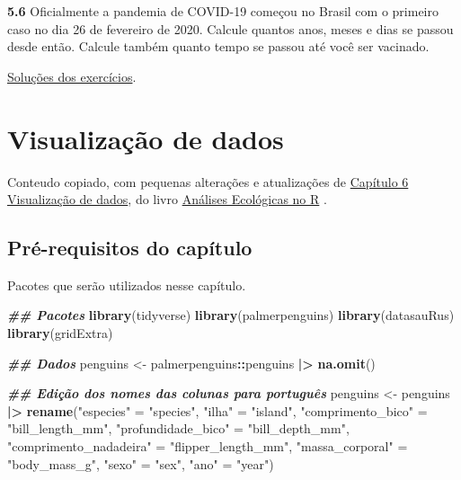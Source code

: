 \documentclass[
]{article}
\newenvironment{Shaded}{\begin{snugshade}}{\end{snugshade}}
\newcommand{\DocumentationTok}[1]{\textcolor[rgb]{0.56,0.35,0.01}{\textbf{\textit{#1}}}}
\newcommand{\FunctionTok}[1]{\textcolor[rgb]{0.13,0.29,0.53}{\textbf{#1}}}
\newcommand{\NormalTok}[1]{#1}
\newcommand{\OtherTok}[1]{\textcolor[rgb]{0.56,0.35,0.01}{#1}}
\newcommand{\SpecialCharTok}[1]{\textcolor[rgb]{0.81,0.36,0.00}{\textbf{#1}}}
\newcommand{\StringTok}[1]{\textcolor[rgb]{0.31,0.60,0.02}{#1}}
\begin{document}
\textbf{5.6}
Oficialmente a pandemia de COVID-19 começou no Brasil com o primeiro caso no dia 26 de fevereiro de 2020. Calcule quantos anos, meses e dias se passou desde então. Calcule também quanto tempo se passou até você ser vacinado.

\href{https://exercicios-livro-aer.netlify.app/cap.-5---tidyverse.html}{Soluções dos exercícios}.

\newpage{}

\hypertarget{cap23}{%
\section{Visualização de dados}\label{cap23}}

Conteudo copiado, com pequenas alterações e atualizações de \href{https://analises-ecologicas.com/cap6}{Capítulo 6 Visualização de dados}, do livro \href{https://analises-ecologicas.com/}{Análises Ecológicas no R} .

\hypertarget{pruxe9-requisitos-do-capuxedtulo-2}{%
\subsection*{Pré-requisitos do capítulo}\label{pruxe9-requisitos-do-capuxedtulo-2}}

Pacotes que serão utilizados nesse capítulo.

\begin{Shaded}
\begin{Highlighting}[]
\DocumentationTok{\#\# Pacotes}
\FunctionTok{library}\NormalTok{(tidyverse)}
\FunctionTok{library}\NormalTok{(palmerpenguins)}
\FunctionTok{library}\NormalTok{(datasauRus)}
\FunctionTok{library}\NormalTok{(gridExtra)}

\DocumentationTok{\#\# Dados}
\NormalTok{penguins }\OtherTok{\textless{}{-}}\NormalTok{ palmerpenguins}\SpecialCharTok{::}\NormalTok{penguins }\SpecialCharTok{|\textgreater{}} 
  \FunctionTok{na.omit}\NormalTok{()}

\DocumentationTok{\#\# Edição dos nomes das colunas para português}
\NormalTok{penguins }\OtherTok{\textless{}{-}}\NormalTok{ penguins }\SpecialCharTok{|\textgreater{}} 
  \FunctionTok{rename}\NormalTok{(}\StringTok{"especies"} \OtherTok{=} \StringTok{"species"}\NormalTok{, }
         \StringTok{"ilha"} \OtherTok{=} \StringTok{"island"}\NormalTok{, }
         \StringTok{"comprimento\_bico"} \OtherTok{=} \StringTok{"bill\_length\_mm"}\NormalTok{, }
         \StringTok{"profundidade\_bico"} \OtherTok{=} \StringTok{"bill\_depth\_mm"}\NormalTok{, }
         \StringTok{"comprimento\_nadadeira"} \OtherTok{=} \StringTok{"flipper\_length\_mm"}\NormalTok{, }
         \StringTok{"massa\_corporal"} \OtherTok{=} \StringTok{"body\_mass\_g"}\NormalTok{, }
         \StringTok{"sexo"} \OtherTok{=} \StringTok{"sex"}\NormalTok{, }
         \StringTok{"ano"} \OtherTok{=} \StringTok{"year"}\NormalTok{)}
\end{Highlighting}
\end{Shaded}
\end{document}
